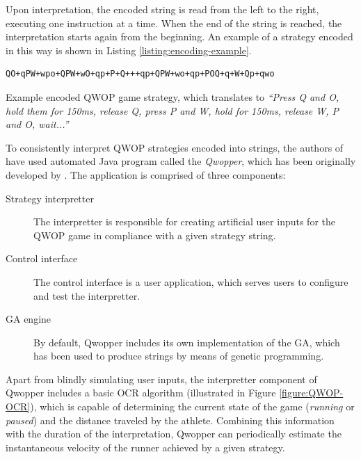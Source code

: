 Upon interpretation, the encoded string is read from the left to the right, executing one instruction at a time. When the end of the string is reached, the interpretation starts again from the beginning. An example of a strategy encoded in this way is shown in Listing \ref{listing:encoding-example}.

\begin{listing}[ht]
	\begin{verbatim}
QO+qPW+wpo+QPW+wO+qp+P+Q+++qp+QPW+wo+qp+POQ+q+W+Qp+qwo
	\end{verbatim}
	\caption[Example encoded QWOP game strategy.]{Example encoded QWOP game strategy, which translates to \textit{``Press Q and O, hold them for 150ms, release Q, press P and W, hold for 150ms, release W, P and O, wait...''} \cite{EvolvingQwopGaits}}
	\label{listing:encoding-example}
\end{listing}

To consistently interpret QWOP strategies encoded into strings, the authors of \cite{EvolvingQwopGaits} have used automated Java program called the \textit{Qwopper}, which has been originally developed by \cite{QwopEncoding}. The application is comprised of three components:
~
\begin{description}
	\item[Strategy interpretter]
	The interpretter is responsible for creating artificial user inputs for the QWOP game in compliance with a given strategy string.

	\item[Control interface]
	The control interface is a user application, which serves users to configure and test the interpretter.

	\item[GA engine]
	By default, Qwopper includes its own implementation of the GA, which has been used to produce strings by means of genetic programming.
\end{description}

Apart from blindly simulating user inputs, the interpretter component of Qwopper includes a basic OCR algorithm (illustrated in Figure \ref{figure:QWOP-OCR}), which is capable of determining the current state of the game (\textit{running} or \textit{paused}) and the distance traveled by the athlete. Combining this information with the duration of the interpretation, Qwopper can periodically estimate the instantaneous velocity of the runner achieved by a given strategy.

